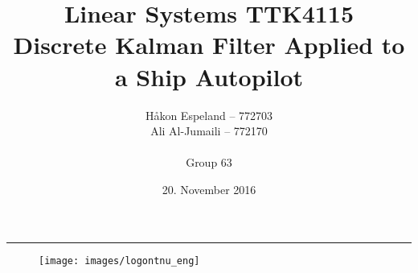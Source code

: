 \documentclass{article}
\title{Linear Systems TTK4115\\\Large{\textbf{Discrete Kalman Filter Applied to a Ship Autopilot}}}
\author{Håkon Espeland -- 772703 \\ Ali Al-Jumaili -- 772170 \\\\ Group 63}
\date{20. November 2016}
\begin{document}
\begin{titlepage}
    \maketitle
    \rule{\linewidth}{0.5mm}
    \begin{figure}
    \centering
    \texttt{[image: images/logontnu\_eng]}
    \end{figure}
    \thispagestyle{empty}
\end{titlepage}
\newpage\null\thispagestyle{empty}\newpage
\tableofcontents
\thispagestyle{empty} %
\newpage   

\newpage\null\thispagestyle{empty}\newpage

\setcounter{page}{1}





\newpage\null\thispagestyle{empty}\newpage


\end{document}
